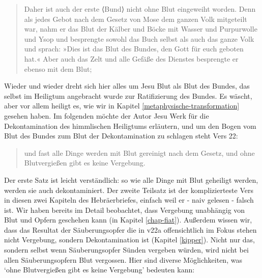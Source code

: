 \begin{quote}
Daher ist auch der erste ⟨Bund⟩ nicht ohne Blut eingeweiht worden.
Denn als jedes Gebot nach dem Gesetz von Mose dem ganzen Volk mitgeteilt war, nahm er das Blut der Kälber und Böcke mit Wasser und Purpurwolle und Ysop und besprengte sowohl das Buch selbst als auch das ganze Volk
und sprach: »Dies ist das Blut des Bundes, den Gott für euch geboten hat.«
Aber auch das Zelt und alle Gefäße des Dienstes besprengte er ebenso mit dem Blut;
\end{quote}
Wieder und wieder dreht sich hier alles um Jesu Blut als Blut des Bundes, das selbst im Heiligtum angebracht wurde zur Ratifizierung des Bundes.
Es wäscht, aber vor allem heiligt es, wie wir in Kapitel \ref{metaphysische-transformation} gesehen haben.
Im folgenden möchte der Autor Jesu Werk für die Dekontamination des himmlischen Heiligtums erläutern, und um den Bogen vom Blut des Bundes zum Blut der Dekontamination zu schlagen steht Vers 22:
\begin{quote}
	und fast alle Dinge werden mit Blut gereinigt nach dem Gesetz, und ohne Blutvergießen gibt es keine Vergebung.
\end{quote}
Der erste Satz ist leicht verständlich: so wie alle Dinge mit Blut geheiligt werden, werden sie auch dekontaminiert.
Der zweite Teilsatz ist der komplizierteste Vers in diesen zwei Kapiteln des Hebräerbriefes, einfach weil er - naiv gelesen - falsch ist.
Wir haben bereits im Detail beobachtet, dass Vergebung unabhängig von Blut und Opfern geschehen kann (in Kapitel \ref{chap-fiat}).
Außerdem wissen wir, dass das Resultat der Säuberungsopfer die in v22a offensichtlich im Fokus stehen nicht Vergebung, sondern Dekontamination ist (Kapitel \ref{kipper}).
Nicht nur das, sondern selbst wenn Säuberungsopfer Sünden vergeben würden, wird nicht bei allen Säuberungsopfern Blut vergossen.
Hier sind diverse Möglichkeiten, was `ohne Blutvergießen gibt es keine Vergebung' bedeuten kann:
